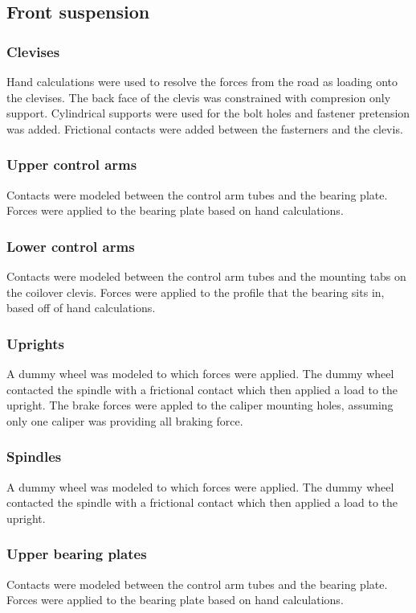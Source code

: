 \documentclass[10pt]{article}
\begin{document}
\subsection{Front suspension}
\subsubsection{Clevises}
Hand calculations were used to resolve the forces from the road as loading onto the clevises. The back face of the clevis was constrained with compresion only support. Cylindrical supports were used for the bolt holes and fastener pretension was added. Frictional contacts were added between the fasterners and the clevis.

\subsubsection{Upper control arms}
Contacts were modeled between the control arm tubes and the bearing plate. Forces were applied to the bearing plate based on hand calculations.

\subsubsection{Lower control arms}
Contacts were modeled between the control arm tubes and the mounting tabs on the coilover clevis. Forces were applied to the profile that the bearing sits in, based off of hand calculations.

\subsubsection{Uprights}
A dummy wheel was modeled to which forces were applied. The dummy wheel contacted the spindle with a frictional contact which then applied a load to the upright. The brake forces were appled to the caliper mounting holes, assuming only one caliper was providing all braking force.

\subsubsection{Spindles}
A dummy wheel was modeled to which forces were applied. The dummy wheel contacted the spindle with a frictional contact which then applied a load to the upright.

\subsubsection{Upper bearing plates}
Contacts were modeled between the control arm tubes and the bearing plate. Forces were applied to the bearing plate based on hand calculations.
\end{document}
